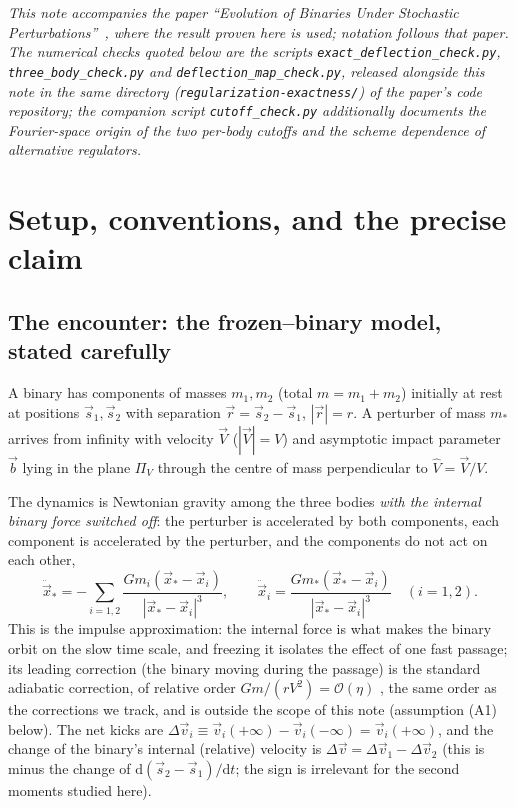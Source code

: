 \documentclass[11pt]{article}
\newcommand{\dd}{\mathrm{d}}
\newcommand{\bv}{\vec b}
\newcommand{\Vh}{\hat V}
\newcommand{\order}[1]{\mathcal O\!\left(#1\right)}
\begin{document}
\tableofcontents

\medskip\noindent
\emph{This note accompanies the paper ``Evolution of Binaries Under Stochastic
Perturbations''~\cite{companion}, where the result proven here is used; notation follows that
paper. The numerical checks quoted
below are the scripts \texttt{exact\_deflection\_check.py}, \texttt{three\_body\_check.py} and
\texttt{deflection\_map\_check.py}, released alongside this note in the same directory
(\texttt{regularization-exactness/}) of the paper's code repository; the companion script
\texttt{cutoff\_check.py} additionally documents the Fourier-space origin of the two per-body
cutoffs and the scheme dependence of alternative regulators.}

\section{Setup, conventions, and the precise claim}
\label{sec:setup}

\subsection{The encounter: the frozen--binary model, stated carefully}
\label{sec:model}
A binary has components of masses $m_1,m_2$ (total $m=m_1+m_2$) initially at rest at positions
$\vec s_1,\vec s_2$ with separation $\vec r=\vec s_2-\vec s_1$, $|\vec r|=r$. A perturber of mass
$m_*$ arrives from infinity with velocity $\vec V$ ($|\vec V|=V$) and asymptotic impact parameter
$\bv$ lying in the plane $\Pi_V$ through the centre of mass perpendicular to $\Vh=\vec V/V$.

The dynamics is Newtonian gravity among the three bodies \emph{with the internal binary force
switched off}: the perturber is accelerated by both components, each component is accelerated by
the perturber, and the components do not act on each other,
\begin{equation}
  \ddot{\vec x}_*=-\sum_{i=1,2}\frac{Gm_i(\vec x_*-\vec x_i)}{|\vec x_*-\vec x_i|^3},\qquad
  \ddot{\vec x}_i=\frac{Gm_*(\vec x_*-\vec x_i)}{|\vec x_*-\vec x_i|^3}\quad(i=1,2).
  \label{eq:model}
\end{equation}
This is the impulse approximation: the internal force is what makes the binary orbit on the slow
time scale, and freezing it isolates the effect of one fast passage; its leading correction (the
binary moving during the passage) is the standard adiabatic correction, of relative order
$Gm/(rV^2)=\order\eta$ \cite{adiabatic}, the same order as the corrections we track, and is outside
the scope of this note (assumption (A1) below). The net kicks are
$\Delta\vec v_i\equiv\vec v_i(+\infty)-\vec v_i(-\infty)=\vec v_i(+\infty)$, and the change of the
binary's internal (relative) velocity is $\Delta\vec v=\Delta\vec v_1-\Delta\vec v_2$ (this is minus
the change of $\dd(\vec s_2-\vec s_1)/\dd t$; the sign is irrelevant for the second moments studied
here).
\end{document}

